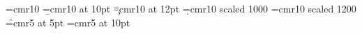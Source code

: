 %
%
%
%

\font\a=cmr10
\font\b=cmr10 at 10pt
\font\c=cmr10 at 12pt
\font\d=cmr10 scaled 1000
\font\e=cmr10 scaled 1200
\font\f=cmr5 at 5pt
\font\g=cmr5 at 10pt
\bye
